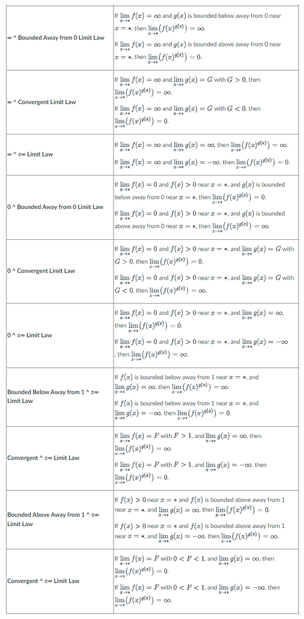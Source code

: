 \documentclass[10pt]{article}
\begin{document}
\includegraphics[scale=0.72]{exponential_limit_laws.png}
\end{document}
